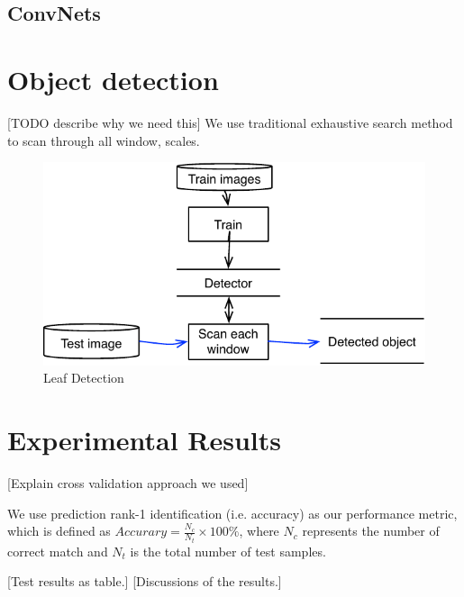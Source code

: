 \documentclass[journal]{IEEEtran}
\begin{document}
\subsection{ConvNets}


\section{Object detection }
[TODO describe why we need this]
We use traditional exhaustive search method to scan through all window, scales.

\newpage
\begin{figure}
  \center
  \includegraphics[scale=0.5]{detection}
  \caption{ Leaf Detection }
  \label{fig:detection}
\end{figure}

\section{Experimental Results}
[Explain cross validation approach we used]

We use prediction rank-1 identification (i.e. accuracy) as our performance metric, which is defined as $Accurary = \frac{N_c}{N_t} \times 100 \%$, where  $N_c$ represents the number of correct match and $N_t$ is the total number of test samples.


[Test results as table.]
[Discussions of the results.]
\end{document}
